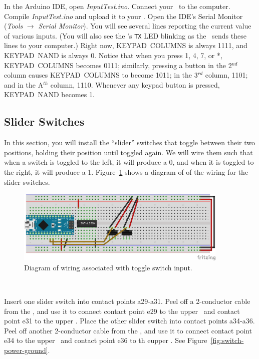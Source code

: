 
In the Arduino IDE, open \textit{InputTest.ino}. Connect your \nano\ to the
computer. Compile \textit{InputTest.ino} and upload it to your \nano. Open the
IDE's Serial Monitor (\textit{Tools} $\rightarrow$ \textit{Serial Monitor}).
You will see several lines reporting the current value of various inputs. (You
will also see the \nano's \texttt{TX} LED blinking as the \nano\ sends these
lines to your computer.) Right now, KEYPAD~COLUMNS is always 1111, and
KEYPAD~NAND is always 0. Notice that when you press 1, 4, 7, or *,
KEYPAD~COLUMNS becomes 0111; similarly, pressing a button in the 2$^{nd}$
column causes KEYPAD~COLUMNS to become 1011; in the 3$^{rd}$ column, 1101; and
in the A$^{th}$ column, 1110. Whenever any keypad button is pressed,
KEYPAD~NAND becomes 1.

\subsection{Slider Switches}

In this section, you will install the ``slider'' switches that toggle between
their two positions, holding their position until toggled again. We will wire
them such that when a switch is toggled to the left, it will produce a 0, and
when it is toggled to the right, it will produce a 1.
Figure~\ref{fig:switch-diagram} shows a diagram of of the wiring for the
slider switches.

\begin{figure}[p]
    \centering
    \includegraphics[width=0.9\textwidth]{fritzing_images/switch}
    \caption{Diagram of wiring associated with toggle switch input.
        \label{fig:switch-diagram}}
\end{figure}

\disconnect\

Insert one slider switch into contact points a29-a31. Peel off a 2-conductor
cable from the \rainbow, and use it to connect contact point e29 to the upper
\ground\ and contact point e31 to the upper \power.  Place the other slider
switch into contact points a34-a36. Peel off another 2-conductor cable from the
\rainbow, and use it to connect contact point e34 to the upper \ground\ and
contact point e36 to th eupper \power. See Figure~\ref{fig:switch-power-ground}.

